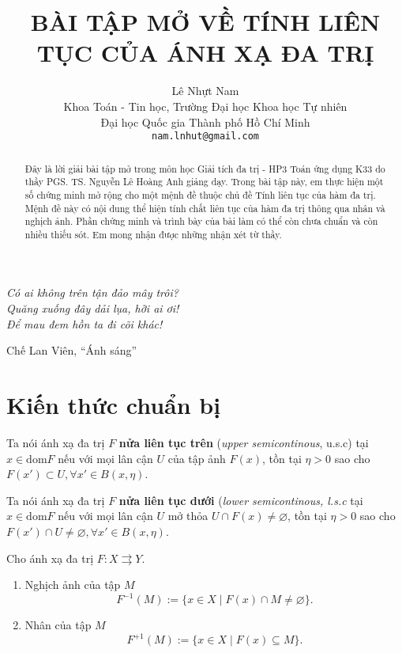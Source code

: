 \documentclass{article}
\title{BÀI TẬP MỞ VỀ TÍNH LIÊN TỤC CỦA ÁNH XẠ ĐA TRỊ}
\author{
    Lê Nhựt Nam \\
    Khoa Toán - Tin học, Trường Đại học Khoa học Tự nhiên\\
    Đại học Quốc gia Thành phố Hồ Chí Minh\\
    \texttt{nam.lnhut@gmail.com} \\
}
\begin{document}
\maketitle
\begin{abstract}
Đây là lời giải bài tập mở trong môn học Giải tích đa trị - HP3 Toán ứng dụng K33 do thầy PGS. TS. Nguyễn Lê Hoàng Anh giảng dạy. Trong bài tập này, em thực hiện một số chứng minh mở rộng cho một mệnh đề thuộc chủ đề Tính liên tục của hàm đa trị. Mệnh đề này có nội dung thể hiện tính chất liên tục của hàm đa trị thông qua nhân và nghịch ảnh. Phần chứng minh và trình bày của bài làm có thể còn chưa chuẩn và còn nhiều thiếu sót. Em mong nhận được những nhận xét từ thầy.
\end{abstract}



\epigraph{\emph{Có ai không trên tận đảo mây trôi?\\
Quăng xuống đây dải lụa, hỡi ai ơi!\\
Để mau đem hồn ta đi cõi khác!}}{Chế Lan Viên, ``Ánh sáng''}

\section{Kiến thức chuẩn bị}

\begin{definition}
    Ta nói ánh xạ đa trị $F$ \textbf{nửa liên tục trên} (\emph{upper semicontinous}, u.s.c) tại $x \in \text{dom}F$ nếu với mọi lân cận $U$ của tập ảnh $F(x)$, tồn tại $\eta > 0$ sao cho $F(x') \subset U, \forall x' \in B(x, \eta)$.
\end{definition}

\begin{definition}
    Ta nói ánh xạ đa trị $F$ \textbf{nửa liên tục dưới} (\emph{lower semicontinous, l.s.c} tại $x \in \text{dom}F$ nếu với mọi lân cận $U$ mở thỏa $U \cap F(x) \ne \varnothing$, tồn tại $\eta > 0$ sao cho $F(x') \cap U \ne \varnothing, \forall x' \in B(x, \eta)$.
\end{definition}

\begin{definition}
    Cho ánh xạ đa trị $F: X\rightrightarrows Y$. 
    \begin{enumerate}[label=(\roman*)]
        \item Nghịch ảnh của tập $M$
        \begin{equation}
            F^{-1}(M) := \{x \in X \mid F(x) \cap M \ne \varnothing\}.
        \end{equation}
        \item Nhân của tập $M$
        \begin{equation}
            F^{+1}(M) := \{x \in X \mid F(x) \subseteq M\}.
        \end{equation}
    \end{enumerate}
\end{definition}
\end{document}
